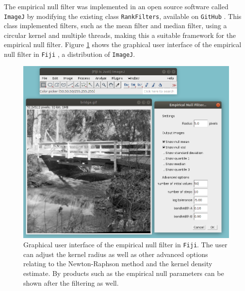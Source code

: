The empirical null filter was implemented in an open source software called \texttt{ImageJ} \citep{abramoff2004image, schneider2012nih, perez2013image} by modifying the existing class \texttt{RankFilters}, available on \texttt{GitHub} \citep{imagej2018rank}. This class implemented filters, such as the mean filter and median filter, using a circular kernel and multiple threads, making this a suitable framework for the empirical null filter. Figure \ref{fig:inference_fijiGui} shows the graphical user interface of the empirical null filter in \texttt{Fiji} \citep{schindelin2012fiji}, a distribution of \texttt{ImageJ}.

\begin{figure}
    \centering
    \includegraphics[width=\textwidth]{../figures/inference/fiji/gui.png}
    \caption{Graphical user interface of the empirical null filter in \texttt{Fiji}. The user can adjust the kernel radius as well as other advanced options relating to the Newton-Raphson method and the kernel density estimate. By products such as the empirical null parameters can be shown after the filtering as well.}
    \label{fig:inference_fijiGui}
\end{figure}

